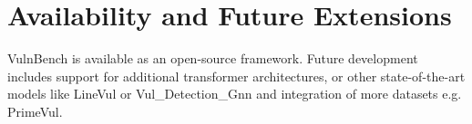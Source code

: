 \documentclass[letterpaper]{article}
\begin{document}
\section{Availability and Future Extensions}

VulnBench is available as an open-source framework. Future development includes support for additional transformer architectures, or other state-of-the-art models like LineVul or Vul\_Detection\_Gnn and integration of more datasets e.g. PrimeVul\citep{ding2024vulnerability}.




\end{document}
